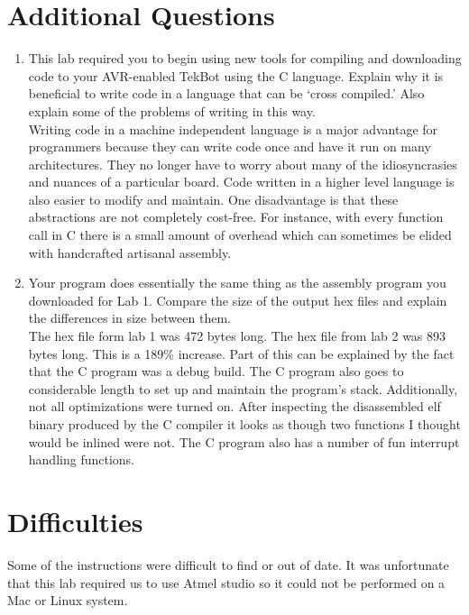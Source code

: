\documentclass[12pt,letterpaper]{article}
\begin{document}
\section{Additional Questions}
\begin{enumerate}
    \item This lab required you to begin using new tools for compiling and
    downloading code to your AVR-enabled TekBot using the C language. Explain
    why it is beneficial to write code in a language that can be ‘cross
    compiled.’ Also explain some of the problems of writing in this way.\\

    Writing code in a machine independent language is a major advantage for
    programmers because they can write code once and have it run on many
    architectures. They no longer have to worry about many of the
    idiosyncrasies and nuances of a particular board. Code written in a higher
    level language is also easier to modify and maintain. One disadvantage is
    that these abstractions are not completely cost-free. For instance, with
    every function call in C there is a small amount of overhead which can
    sometimes be elided with handcrafted artisanal assembly.

    \item Your program does essentially the same thing as the assembly program
    you downloaded for Lab 1. Compare the size of the output hex files and
    explain the differences in size between them.\\

    The hex file form lab 1 was 472 bytes long. The hex file from lab 2 was 893
    bytes long. This is a 189\% increase. Part of this can be explained by the
    fact that the C program was a debug build. The C program also goes to
    considerable length to set up and maintain the program's stack.
    Additionally, not all optimizations were turned on. After inspecting the
    disassembled elf binary produced by the C compiler it looks as though two
    functions I thought would be inlined were not. The C program also has a
    number of fun interrupt handling functions.

\end{enumerate}

\section{Difficulties}
Some of the instructions were difficult to find or out of date. It was
unfortunate that this lab required us to use Atmel studio so it could not be
performed on a Mac or Linux system.
\end{document}
